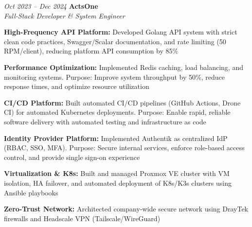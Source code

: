 \begin{twocolentry}{\textit{Oct 2023 -- Dec 2024}}
    \textbf{ActsOne} \\[4pt]
    \textit{Full-Stack Developer \& System Engineer}
\end{twocolentry}
\begin{onecolentry}
    \begin{highlights}
        \item \textbf{High-Frequency API Platform:} Developed Golang API system with strict clean code practices, Swagger/Scalar documentation, and rate limiting (50 RPM/client), reducing platform API consumption by 85\%
        \item \textbf{Performance Optimization:} Implemented Redis caching, load balancing, and monitoring systems. Purpose: Improve system throughput by 50\%, reduce response times, and optimize resource utilization
        \item \textbf{CI/CD Platform:} Built automated CI/CD pipelines (GitHub Actions, Drone CI) for automated Kubernetes deployments. Purpose: Enable rapid, reliable software delivery with automated testing and infrastructure as code
        \item \textbf{Identity Provider Platform:} Implemented Authentik as centralized IdP (RBAC, SSO, MFA). Purpose: Secure internal services, enforce role-based access control, and provide single sign-on experience
        \item \textbf{Virtualization \& K8s:} Built and managed Proxmox VE cluster with VM isolation, HA failover, and automated deployment of K8s/K3s clusters using Ansible playbooks
        \item \textbf{Zero-Trust Network:} Architected company-wide secure network using DrayTek firewalls and Headscale VPN (Tailscale/WireGuard)
    \end{highlights}
\end{onecolentry}
\vspace{0.2 cm}

